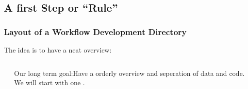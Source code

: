 \subsection{A first Step or ``Rule''}

\begin{frame}[fragile]
  \frametitle{Layout of a Workflow Development Directory} 
  The idea is to have a neat overview:
  \begin{columns}
    \begin{column}{0.5\textwidth}
      
  \begin{minipage}[t]{0.5\textwidth}
            {\tiny \DTsetlength{0.2em}{1em}{0.2em}{0.4pt}{.6pt}
}
    \end{minipage}
    \end{column}
    \begin{column}{0.5\textwidth}
      \begin{hint}
      	Our long term goal:\newline Have a orderly overview and seperation of data and code. We will start with one .
      \end{hint}
    \end{column}
  \end{columns}
\end{frame}

